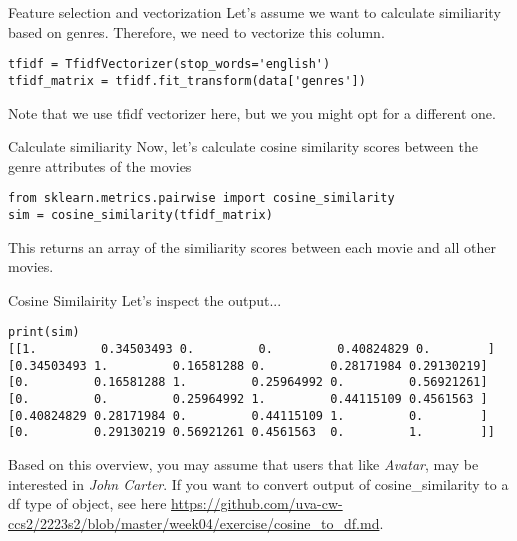 \begin{frame}[fragile]{Feature selection and vectorization}
	Let's assume we want to calculate similiarity based on genres. Therefore, we need to vectorize this column. 
	\begin{verbatim}
tfidf = TfidfVectorizer(stop_words='english')
tfidf_matrix = tfidf.fit_transform(data['genres'])
	\end{verbatim}
	\pause
Note that we use \alert{tfidf vectorizer} here, but we you might opt for a different one. 
\end{frame}

\begin{frame}[fragile]{Calculate similiarity}
	Now, let's calculate cosine similarity scores between the genre attributes of the movies
	\begin{verbatim}
from sklearn.metrics.pairwise import cosine_similarity
sim = cosine_similarity(tfidf_matrix)
	\end{verbatim}
	\pause
This returns an array of the similiarity scores between each movie and all other movies. 
\end{frame}

\begin{frame}[fragile]{Cosine Similairity}
	Let's inspect the output...
\begin{verbatim}
print(sim)
[[1.         0.34503493 0.         0.         0.40824829 0.        ]
[0.34503493 1.         0.16581288 0.         0.28171984 0.29130219]
[0.         0.16581288 1.         0.25964992 0.         0.56921261]
[0.         0.         0.25964992 1.         0.44115109 0.4561563 ]
[0.40824829 0.28171984 0.         0.44115109 1.         0.        ]
[0.         0.29130219 0.56921261 0.4561563  0.         1.        ]]
\end{verbatim}
\end{frame}


\begin{frame}[plain]
	\pause
	Based on this overview, you may assume that users that like \textit{Avatar}, may be interested in \textit{John Carter}. 
		\pause
	\footnotesize{If you want to convert output of \alert{cosine\_similarity} to a \alert{df} type of object, see here \url{https://github.com/uva-cw-ccs2/2223s2/blob/master/week04/exercise/cosine_to_df.md}.}
\end{frame}


